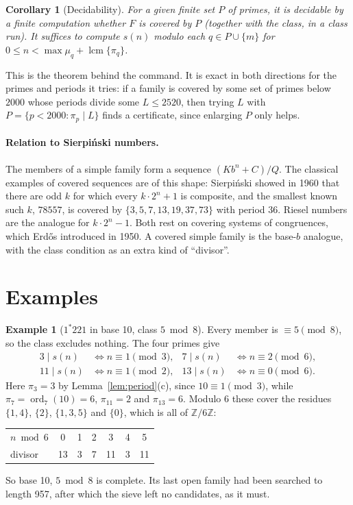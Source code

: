 \documentclass[11pt]{article}
\newtheorem{corollary}[theorem]{Corollary}
\theoremstyle{definition}
\newtheorem{example}[theorem]{Example}
\theoremstyle{remark}
\newcommand{\ord}{\operatorname{ord}}
\begin{document}
\begin{corollary}[Decidability]\label{cor:decide}
For a given finite set $P$ of primes, it is decidable by a finite computation whether $F$ is covered by $P$ (together with the class, in a class run). It suffices to compute $s(n)$ modulo each $q\in P\cup\{m\}$ for $0\le n<\max\mu_q+\operatorname{lcm}\{\pi_q\}$.
\end{corollary}

This is the theorem behind the command. It is exact in both directions for the primes and periods it tries: if a family is covered by some set of primes below $2000$ whose periods divide some $L\le 2520$, then trying $L$ with $P=\{p<2000:\pi_p\mid L\}$ finds a certificate, since enlarging $P$ only helps.

\paragraph{Relation to Sierpi\'nski numbers.} The members of a simple family form a sequence $(Kb^n+C)/Q$. The classical examples of covered sequences are of this shape: Sierpi\'nski showed in 1960 that there are odd $k$ for which every $k\cdot 2^n+1$ is composite, and the smallest known such $k$, $78557$, is covered by $\{3,5,7,13,19,37,73\}$ with period $36$. Riesel numbers are the analogue for $k\cdot 2^n-1$. Both rest on covering systems of congruences, which Erd\H{o}s introduced in 1950. A covered simple family is the base-$b$ analogue, with the class condition as an extra kind of ``divisor''.

\section{Examples}

\begin{example}[$1^*221$ in base 10, class $5 \bmod 8$]
Every member is $\equiv 5\pmod 8$, so the class excludes nothing. The four primes give
\begin{align*}
  3\mid s(n) &\iff n\equiv 1 \pmod 3, & 7\mid s(n) &\iff n\equiv 2 \pmod 6,\\
  11\mid s(n) &\iff n\equiv 1 \pmod 2, & 13\mid s(n) &\iff n\equiv 0 \pmod 6.
\end{align*}
Here $\pi_3=3$ by Lemma~\ref{lem:period}(c), since $10\equiv1\pmod 3$, while $\pi_7=\ord_7(10)=6$, $\pi_{11}=2$ and $\pi_{13}=6$. Modulo $6$ these cover the residues $\{1,4\}$, $\{2\}$, $\{1,3,5\}$ and $\{0\}$, which is all of $\mathbb{Z}/6\mathbb{Z}$:

\begin{center}
\begin{tabular}{@{}lcccccc@{}}
\toprule
$n\bmod 6$ & 0 & 1 & 2 & 3 & 4 & 5\\
divisor & 13 & 3 & 7 & 11 & 3 & 11\\
\bottomrule
\end{tabular}
\end{center}

So base 10, $5 \bmod 8$ is complete. Its last open family had been searched to length 957, after which the sieve left no candidates, as it must.
\end{example}
\end{document}
